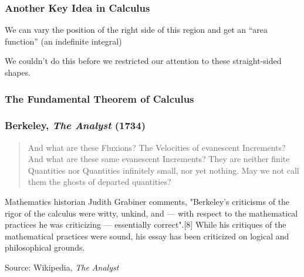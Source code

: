 \documentclass{beamer}
\begin{document}
\begin{frame}
\frametitle{Another Key Idea in Calculus}

\begin{center}
We can vary the position of the right side of this region and get an ``area function''
(an indefinite integral)

\vskip 12pt


\vskip 12pt

We couldn't do this before we restricted our attention to these straight-sided shapes.

\end{center}

\end{frame}

\begin{frame}
\frametitle{The Fundamental Theorem of Calculus}
\end{frame}

\begin{frame}
\frametitle{Berkeley, {\it The Analyst} (1734)}

\begin{quotation}
    And what are these Fluxions? The Velocities of evanescent Increments? And what are these same evanescent Increments? They are neither finite Quantities nor Quantities infinitely small, nor yet nothing. May we not call them the ghosts of departed quantities?
\end{quotation}

Mathematics historian Judith Grabiner comments, "Berkeley's criticisms of the rigor of the calculus were witty, unkind, and — with respect to the mathematical practices he was criticizing — essentially correct".[8] While his critiques of the mathematical practices were sound, his essay has been criticized on logical and philosophical grounds. 

\vskip 12pt
Source: Wikipedia, {\it The Analyst}
\end{frame}
\end{document}

